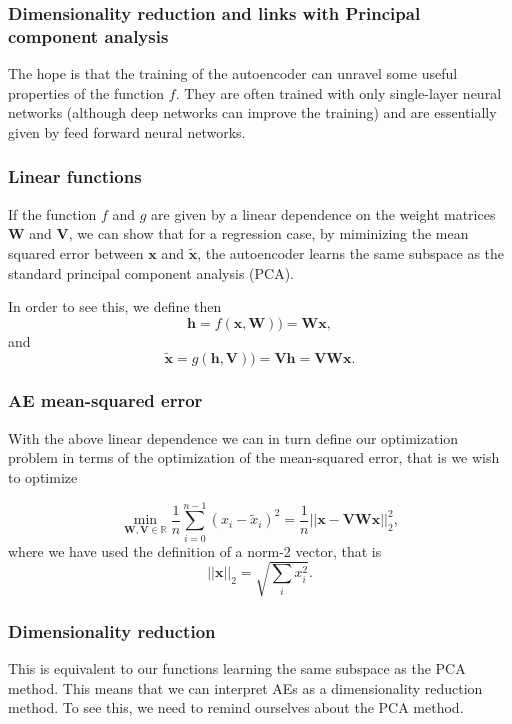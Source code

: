 \documentclass{beamer}
\begin{document}
\begin{frame}
\frametitle{Dimensionality reduction and links with Principal component analysis}

The hope is that the training of the autoencoder can unravel some
useful properties of the function $f$. They are often trained with
only single-layer neural networks (although deep networks can improve
the training) and are essentially given by feed forward neural
networks.
\end{frame}

\begin{frame}
\frametitle{Linear functions}

If the function $f$ and $g$ are given by a linear dependence on the
weight matrices $\bm{W}$ and $\bm{V}$, we can show that for a
regression case, by miminizing the mean squared error between $\bm{x}$
and $\tilde{\bm{x}}$, the autoencoder learns the same subspace as the
standard principal component analysis (PCA).

In order to see this, we define then
\[
\bm{h} = f(\bm{x},\bm{W}))=\bm{W}\bm{x},
\]
and
\[
\tilde{\bm{x}} = g(\bm{h},\bm{V}))=\bm{V}\bm{h}=\bm{V}\bm{W}\bm{x}.
\]
\end{frame}

\begin{frame}
\frametitle{AE mean-squared error}

With the above linear dependence we can in turn define our
optimization problem in terms of the optimization of the mean-squared
error, that is we wish to optimize

\[
\min_{\bm{W},\bm{V}\in {\mathbb{R}}}\frac{1}{n}\sum_{i=0}^{n-1}\left(x_i-\tilde{x}_i\right)^2=\frac{1}{n}\vert\vert \bm{x}-\bm{V}\bm{W}\bm{x}\vert\vert_2^2,
\]
where we have used the definition of  a norm-2 vector, that is
\[
\vert\vert \bm{x}\vert\vert_2 = \sqrt{\sum_i x_i^2}. 
\]
\end{frame}

\begin{frame}
\frametitle{Dimensionality reduction}

This is equivalent to our functions learning the same subspace as
the PCA method. This means that we can interpret AEs as a
dimensionality reduction method.  To see this, we need to remind
ourselves about the PCA method.
\end{frame}
\end{document}
